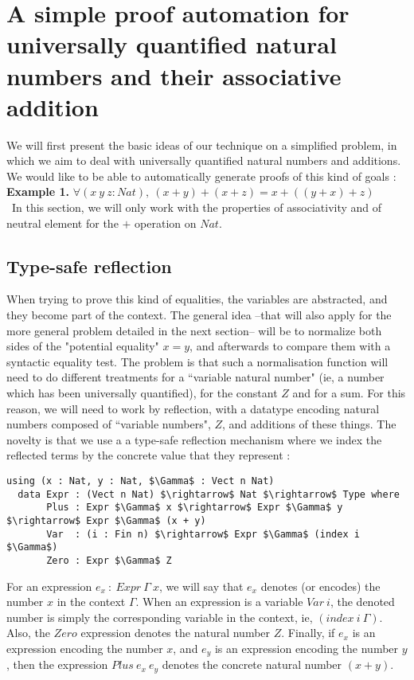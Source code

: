 \section{A simple proof automation for universally quantified natural numbers and their associative addition}
\label{sect:aSimpleProofAutomation}


We will first present the basic ideas of our technique on a simplified problem, in which we aim to deal with universally quantified natural numbers and additions. We would like to be able to automatically generate proofs of this kind of goals :
\\
\textbf{Example 1.} $\forall (x\ y\ z:Nat),\ (x + y) + (x + z) = x + ((y + x) + z)$  \\
\
In this section, we will only work with the properties of associativity and of neutral element for the $+$ operation on $Nat$.

\subsection{Type-safe reflection}


When trying to prove this kind of equalities, the variables are abstracted, and they become part of the context. The general idea --that will also apply for the more general problem detailed in the next section-- will be to normalize both sides of the "potential equality" $x=y$, and afterwards to compare them with a syntactic equality test. The problem is that such a normalisation function will need to do different treatments for a ``variable natural number" (ie, a number which has been universally quantified), for the constant $Z$ and for a sum. For this reason, we will need to work by reflection, with a datatype encoding natural numbers composed of ``variable numbers", $Z$, and additions of these things. The novelty is that we use a a type-safe reflection mechanism where we index the reflected terms by the concrete value that they represent : 

\begin{lstlisting}
using (x : Nat, y : Nat, $\Gamma$ : Vect n Nat)
  data Expr : (Vect n Nat) $\rightarrow$ Nat $\rightarrow$ Type where
       Plus : Expr $\Gamma$ x $\rightarrow$ Expr $\Gamma$ y $\rightarrow$ Expr $\Gamma$ (x + y)
       Var  : (i : Fin n) $\rightarrow$ Expr $\Gamma$ (index i $\Gamma$)
       Zero : Expr $\Gamma$ Z
\end{lstlisting}

For an expression $e_x\ :\ Expr\ \Gamma\ x$, we will say that $e_x$ denotes (or encodes) the number $x$ in the context $\Gamma$.
When an expression is a variable $Var\ i$, the denoted number is simply the corresponding variable in the context, ie, $(index\ i\ \Gamma)$.
Also, the $Zero$ expression denotes the natural number $Z$. Finally, if $e_x$ is an expression encoding the number $x$, and $e_y$ is an expression encoding the number $y$, then the expression $Plus\ e_x\ e_y$ denotes the concrete natural number $(x + y)$.


